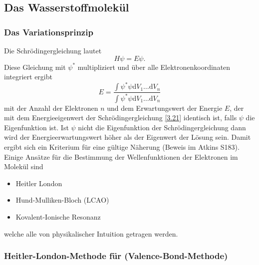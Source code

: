 \setcounter{section}{3}
\setcounter{subsection}{2}
\setcounter{equation}{20}

\subsection{Das Wasserstoffmolekül }
\subsubsection{Das Variationsprinzip}
Die Schrödingergleichung lautet
\begin{equation}
	\label{3.21}
	H \psi = E \psi.
\end{equation}
Diese Gleichung mit $ \psi^{*}$ multipliziert und über alle Elektronenkoordinaten integriert ergibt
\begin{equation}
	E = \frac{ \int \psi^{*} \psi \mathrm{d} V_1 \ldots \mathrm{d} V_n}{ \int \psi^{*} \psi \mathrm{d} V_1 \ldots\mathrm{d}V_{n}}
\end{equation}
mit der Anzahl der Elektronen $n$ und dem Erwartungswert der Energie $E$, der mit dem Energieeigenwert der Schrödingergleichung \ref{3.21} identisch ist, falls $ \psi$ die Eigenfunktion ist. Ist $ \psi$ nicht die Eigenfunktion der Schrödingergleichung dann wird der Energieerwartungswert höher als der Eigenwert der Lösung sein. Damit ergibt sich ein Kriterium für eine gültige Näherung (Beweis im Atkins S183).
Einige Ansätze für die Bestimmung der Wellenfunktionen der Elektronen im  Molekül sind
 \begin{itemize}
	\item Heitler London
	\item Hund-Mulliken-Bloch (LCAO) 
	\item Kovalent-Ionische Resonanz
\end{itemize}
welche alle von physikalischer Intuition getragen werden.

\subsubsection{Heitler-London-Methode für  (Valence-Bond-Methode)}
\begin{figure}[H]
    \centering
    \label{fig:vl05_abb1_kerne_u_elek}
\end{figure}

